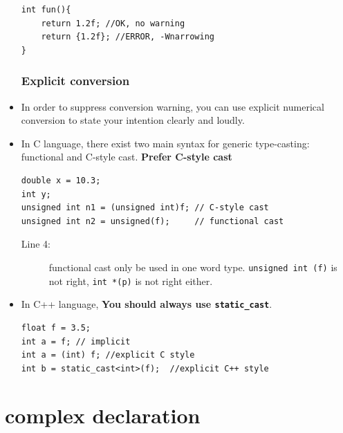 \documentclass[a4paper,11pt,twoside]{book}
\begin{document}
\begin{itemize}
\begin{lstlisting}[numbers=none]
int fun(){
	return 1.2f; //OK, no warning
	return {1.2f}; //ERROR, -Wnarrowing
}
\end{lstlisting}

\subsubsection{Explicit conversion}
	
	\item In order to suppress conversion warning, you can use explicit numerical conversion to state your intention clearly and loudly.
	
	\item In C language, there exist two main syntax for generic type-casting: functional and C-style cast.  \textbf{Prefer C-style cast}
	
\begin{lstlisting}[numbers=none]
double x = 10.3;
int y;
unsigned int n1 = (unsigned int)f; // C-style cast
unsigned int n2 = unsigned(f);     // functional cast
\end{lstlisting}
	\begin{description}
		\item[Line 4:] functional cast only be used in one word type. \texttt{unsigned int (f)} is not right, \texttt{int *(p)} is not right either.
	\end{description}
	
	\item In C++ language, \textbf{You should always use \texttt{static\_cast}}. 
\begin{lstlisting}[numbers=none]
float f = 3.5; 
int a = f; // implicit 
int a = (int) f; //explicit C style
int b = static_cast<int>(f);  //explicit C++ style
\end{lstlisting}

\end{itemize}


\section{complex declaration}
\end{document}
